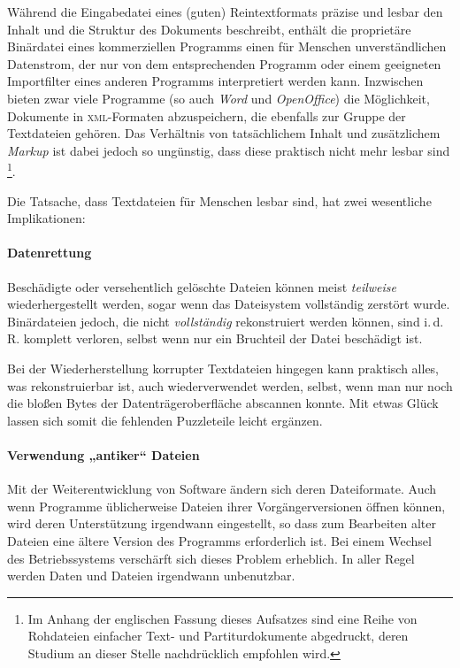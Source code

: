 \documentclass[DIV=12]{scrreprt}
\begin{document}
Während die Eingabedatei eines (guten) Reintextformats präzise und lesbar den Inhalt und die Struktur des Dokuments beschreibt, enthält die proprietäre Binärdatei eines kommerziellen Programms einen für Menschen unverständlichen Datenstrom, der nur von dem entsprechenden Programm oder einem geeigneten Importfilter eines anderen Programms interpretiert werden kann.
Inzwischen bieten zwar viele Programme (so auch \emph{Word} und \emph{OpenOffice}) die Möglichkeit, Dokumente in \textsc{xml}-Formaten abzuspeichern, die ebenfalls zur Gruppe der Textdateien gehören.
Das Verhältnis von tatsächlichem Inhalt und zusätzlichem \emph{Markup} ist dabei jedoch so ungünstig, dass diese praktisch nicht mehr lesbar sind%
\footnote{Im Anhang der englischen Fassung dieses Aufsatzes sind eine Reihe von Rohdateien einfacher Text- und Partiturdokumente abgedruckt, deren Studium an dieser Stelle nachdrücklich empfohlen wird.}.

Die Tatsache, dass Textdateien für Menschen lesbar sind, hat zwei wesentliche Implikationen:

\paragraph{Datenrettung}
Beschädigte oder versehentlich gelöschte Dateien können meist \emph{teilweise} wiederhergestellt werden, sogar wenn das Dateisystem vollständig zerstört wurde.
Binärdateien jedoch, die nicht \emph{vollständig} rekonstruiert werden können, sind i.\,d.\,R. komplett verloren, selbst wenn nur ein Bruchteil der Datei beschädigt ist.

Bei der Wiederherstellung korrupter Textdateien hingegen kann praktisch alles, was rekonstruierbar ist, auch wiederverwendet werden, selbst, wenn man nur noch die bloßen Bytes der Datenträgeroberfläche abscannen konnte.
Mit etwas Glück lassen sich somit die fehlenden Puzzleteile leicht ergänzen.

\paragraph{Verwendung „antiker“ Dateien}
Mit der Weiterentwicklung von Software ändern sich deren Dateiformate.
Auch wenn Programme üblicherweise Dateien ihrer Vorgängerversionen öffnen können, wird deren Unterstützung irgendwann eingestellt, so dass zum Bearbeiten alter Dateien eine ältere Version des Programms erforderlich ist.
Bei einem Wechsel des Betriebssystems verschärft sich dieses Problem erheblich.
In aller Regel werden Daten und Dateien irgendwann unbenutzbar.
\end{document}
